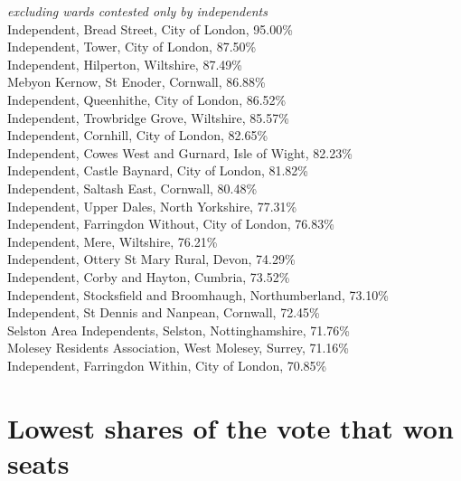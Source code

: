 \documentclass[a4paper,openany,10pt]{book}
\begin{document}
\emph{excluding wards contested only by independents}\\
Independent, Bread Street, City of London, 95.00\%\\ %
Independent, Tower, City of London, 87.50\%\\ %
Independent, Hilperton, Wiltshire, 87.49\%\\ %
Mebyon Kernow, St Enoder, Cornwall, 86.88\%\\ %
Independent, Queenhithe, City of London, 86.52\%\\ %
Independent, Trowbridge Grove, Wiltshire, 85.57\%\\ %
Independent, Cornhill, City of London, 82.65\%\\ %
Independent, Cowes West and Gurnard, Isle of Wight, 82.23\%\\ %
Independent, Castle Baynard, City of London, 81.82\%\\ %
Independent, Saltash East, Cornwall, 80.48\%\\ %
Independent, Upper Dales, North Yorkshire, 77.31\%\\ %
Independent, Farringdon Without, City of London, 76.83\%\\ %
Independent, Mere, Wiltshire, 76.21\%\\ %
Independent, Ottery St Mary Rural, Devon, 74.29\%\\ %
Independent, Corby and Hayton, Cumbria, 73.52\%\\ %
Independent, Stocksfield and Broomhaugh, Northumberland, 73.10\%\\ %
Independent, St Dennis and Nanpean, Cornwall, 72.45\%\\ %
Selston Area Independents, Selston, Nottinghamshire, 71.76\%\\ %
Molesey Residents Association, West Molesey, Surrey, 71.16\%\\ %
Independent, Farringdon Within, City of London, 70.85\%\\ %

\section{Lowest shares of the vote that won seats}
\end{document}
